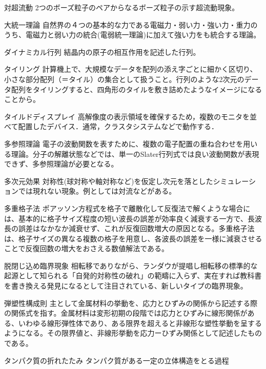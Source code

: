 \begin{用語集}
\item{対超流動}{}
{2つのボーズ粒子のペアからなるボーズ粒子の示す超流動現象。}
\item{大統一理論}{}
{自然界の４つの基本的な力である電磁力・弱い力・強い力・重力のうち、電磁力と弱い力の統合(電弱統一理論)に加えて強い力をも統合する理論。}
\item{ダイナミカル行列}{}
{結晶内の原子の相互作用を記述した行列。}
\item{タイリング}{}
{計算機上で、大規模なデータを配列の添え字ごとに細かく区切り、小さな部分配列（＝タイル）の集合として扱うこと。行列のような2次元のデータ配列をタイリングすると、四角形のタイルを敷き詰めたようなイメージになることから。}
\item{タイルドディスプレイ}{}
{高解像度の表示領域を確保するため，複数のモニタを並べて配置したデバイス．通常，クラスタシステムなどで動作する．}
\item{多参照理論}{}
{電子の波動関数を表すために、複数の電子配置の重ね合わせを用いる理論。分子の解離状態などでは、単一のSlater行列式では良い波動関数が表現できず、多参照理論が必要となる。}
\item{多次元効果}{}
{対称性(球対称や軸対称など)を仮定し次元を落としたシミュレーションでは現れない現象。例としては対流などがある。}
\item{多重格子法}{}
{ポアッソン方程式を格子で離散化して反復法で解くような場合には、基本的に格子サイズ程度の短い波長の誤差が効率良く減衰する一方で、長波長の誤差はなかなか減衰せず、これが反復回数増大の原因となる。多重格子法は、格子サイズの異なる複数の格子を用意し、各波長の誤差を一様に減衰させることで反復回数の増大をおさえる数値解法である。}
\item{脱閉じ込め臨界現象}{}
{相転移でありながら、ランダウが提唱し相転移の標準的な起源として知られる「自発的対称性の破れ」の範疇に入らず、実在すれば教科書を書き換える発見になるとして注目されている、新しいタイプの臨界現象。}
\item{弾塑性構成則}{}
{主として金属材料の挙動を、応力とひずみの関係から記述する際の関係式を指す。金属材料は変形初期の段階では応力とひずみに線形関係がある、いわゆる線形弾性体であり、ある限界を超えると非線形な塑性挙動を呈するようになる。その限界値と、非線形挙動を応力ーひずみ関係として記述したものである。}
\item{タンパク質の折れたたみ}{}
{タンパク質がある一定の立体構造をとる過程}

\end{用語集}
